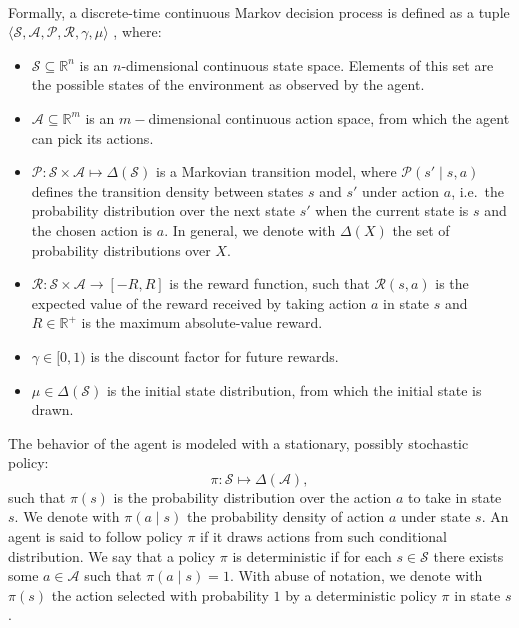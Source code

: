 \paragraph{} %
Formally, a discrete-time continuous Markov decision process is defined as a tuple
$\langle \mathcal{S},\mathcal{A},\mathcal{P},\mathcal{R},\gamma,\mu \rangle$
, where:
\begin{itemize}
\item $\mathcal{S} \subseteq \mathbb{R}^n$ is an $n$-dimensional continuous state space. Elements of this set are the possible states of the environment as observed by the agent.
\item $\mathcal{A}\subseteq \mathbb{R}^m$ is an $m-$dimensional continuous action space, from which the agent can pick its actions.
\item  $\mathcal{P} \colon \mathcal{S}\times\mathcal{A} \mapsto \Delta(\mathcal{S}) $ is a Markovian transition model, where $\mathcal{P}(s'\mid s,a)$ defines the transition density between states $s$ and $s'$ under action $a$, i.e.\ the probability distribution over the next state $s'$ when the current state is $s$ and the chosen action is $a$. In general, we denote with $\Delta(X)$ the set of probability distributions over $X$.
\item $\mathcal{R}:\mathcal{S} \times \mathcal{A} \rightarrow [-R,R]$ is the reward function, such that $\mathcal{R}(s,a)$ is the expected value of the reward received by taking action $a$ in state $s$ and $R \in \mathbb{R^+}$ is the maximum absolute-value reward.
\item $\gamma \in [0,1)$ is the discount factor for future rewards.
\item $\mu \in \Delta(\mathcal{S})$ is the initial state distribution, from which the initial state is drawn.
\end{itemize}
The behavior of the agent is modeled with a stationary, possibly stochastic policy:
 \[
 	\pi \colon \mathcal{S}\mapsto\Delta(\mathcal{A}),
 \] 
such that $\pi(s)$ is the probability distribution over the action $a$ to take in state $s$. We denote with $\pi(a \mid s)$ the probability density of action $a$ under state $s$. An agent is said to follow policy $\pi$ if it draws actions from such conditional distribution. 
We say that a policy $\pi$ is deterministic if for each $s \in \mathcal{S}$ there exists some $a \in \mathcal{A}$ such that $\pi(a \mid s) = 1$. With abuse of notation, we denote with $\pi(s)$ the action selected with probability $1$ by a deterministic policy $\pi$ in state $s$.

